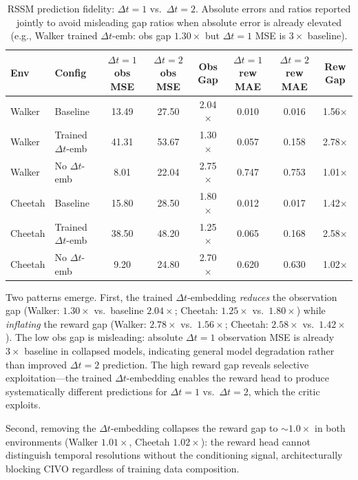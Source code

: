 \documentclass[10pt,letterpaper]{article}
\newcommand{\dt}{\Delta t}
\begin{document}
\begin{table}[h]
\centering
\caption{RSSM prediction fidelity: $\dt{=}1$ vs.\ $\dt{=}2$. Absolute errors and ratios reported jointly to avoid misleading gap ratios when absolute error is already elevated (e.g., Walker trained $\dt$-emb: obs gap $1.30\times$ but $\dt{=}1$ MSE is $3\times$ baseline).}
\label{tab:rssm}
\small
\begin{tabular}{llcccccc}
\toprule
Env & Config & $\dt{=}1$ obs MSE & $\dt{=}2$ obs MSE & Obs Gap & $\dt{=}1$ rew MAE & $\dt{=}2$ rew MAE & Rew Gap \\
\midrule
Walker  & Baseline       & 13.49 & 27.50 & 2.04$\times$ & 0.010 & 0.016 & 1.56$\times$ \\
Walker  & Trained $\dt$-emb  & 41.31 & 53.67 & 1.30$\times$ & 0.057 & 0.158 & 2.78$\times$ \\
Walker  & No $\dt$-emb      & 8.01  & 22.04 & 2.75$\times$ & 0.747 & 0.753 & 1.01$\times$ \\
\midrule
Cheetah & Baseline       & 15.80 & 28.50 & 1.80$\times$ & 0.012 & 0.017 & 1.42$\times$ \\
Cheetah & Trained $\dt$-emb  & 38.50 & 48.20 & 1.25$\times$ & 0.065 & 0.168 & 2.58$\times$ \\
Cheetah & No $\dt$-emb      & 9.20  & 24.80 & 2.70$\times$ & 0.620 & 0.630 & 1.02$\times$ \\
\bottomrule
\end{tabular}
\end{table}

Two patterns emerge.
First, the trained $\dt$-embedding \emph{reduces} the observation gap (Walker: $1.30\times$ vs.\ baseline $2.04\times$; Cheetah: $1.25\times$ vs.\ $1.80\times$) while \emph{inflating} the reward gap (Walker: $2.78\times$ vs.\ $1.56\times$; Cheetah: $2.58\times$ vs.\ $1.42\times$).
The low obs gap is misleading: absolute $\dt{=}1$ observation MSE is already $3\times$ baseline in collapsed models, indicating general model degradation rather than improved $\dt{=}2$ prediction.
The high reward gap reveals selective exploitation---the trained $\dt$-embedding enables the reward head to produce systematically different predictions for $\dt{=}1$ vs.\ $\dt{=}2$, which the critic exploits.

Second, removing the $\dt$-embedding collapses the reward gap to ${\sim}1.0\times$ in both environments (Walker $1.01\times$, Cheetah $1.02\times$): the reward head cannot distinguish temporal resolutions without the conditioning signal, architecturally blocking CIVO regardless of training data composition.
\end{document}
